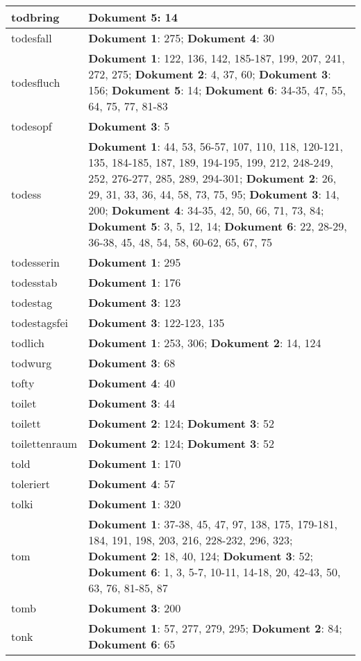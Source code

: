 \documentclass[a5paper]{article}
\begin{document}
\begin{longtable}[l]{|l|p{3in}|}
\hline
todbring & \textbf{Dokument 5}: 14 \\
\hline
todesfall & \textbf{Dokument 1}: 275; \textbf{Dokument 4}: 30 \\
\hline
todesfluch & \textbf{Dokument 1}: 122, 136, 142, 185-187, 199, 207, 241, 272, 275; \textbf{Dokument 2}: 4, 37, 60; \textbf{Dokument 3}: 156; \textbf{Dokument 5}: 14; \textbf{Dokument 6}: 34-35, 47, 55, 64, 75, 77, 81-83 \\
\hline
todesopf & \textbf{Dokument 3}: 5 \\
\hline
todess & \textbf{Dokument 1}: 44, 53, 56-57, 107, 110, 118, 120-121, 135, 184-185, 187, 189, 194-195, 199, 212, 248-249, 252, 276-277, 285, 289, 294-301; \textbf{Dokument 2}: 26, 29, 31, 33, 36, 44, 58, 73, 75, 95; \textbf{Dokument 3}: 14, 200; \textbf{Dokument 4}: 34-35, 42, 50, 66, 71, 73, 84; \textbf{Dokument 5}: 3, 5, 12, 14; \textbf{Dokument 6}: 22, 28-29, 36-38, 45, 48, 54, 58, 60-62, 65, 67, 75 \\
\hline
todesserin & \textbf{Dokument 1}: 295 \\
\hline
todesstab & \textbf{Dokument 1}: 176 \\
\hline
todestag & \textbf{Dokument 3}: 123 \\
\hline
todestagsfei & \textbf{Dokument 3}: 122-123, 135 \\
\hline
todlich & \textbf{Dokument 1}: 253, 306; \textbf{Dokument 2}: 14, 124 \\
\hline
todwurg & \textbf{Dokument 3}: 68 \\
\hline
tofty & \textbf{Dokument 4}: 40 \\
\hline
toilet & \textbf{Dokument 3}: 44 \\
\hline
toilett & \textbf{Dokument 2}: 124; \textbf{Dokument 3}: 52 \\
\hline
toilettenraum & \textbf{Dokument 2}: 124; \textbf{Dokument 3}: 52 \\
\hline
told & \textbf{Dokument 1}: 170 \\
\hline
toleriert & \textbf{Dokument 4}: 57 \\
\hline
tolki & \textbf{Dokument 1}: 320 \\
\hline
tom & \textbf{Dokument 1}: 37-38, 45, 47, 97, 138, 175, 179-181, 184, 191, 198, 203, 216, 228-232, 296, 323; \textbf{Dokument 2}: 18, 40, 124; \textbf{Dokument 3}: 52; \textbf{Dokument 6}: 1, 3, 5-7, 10-11, 14-18, 20, 42-43, 50, 63, 76, 81-85, 87 \\
\hline
tomb & \textbf{Dokument 3}: 200 \\
\hline
tonk & \textbf{Dokument 1}: 57, 277, 279, 295; \textbf{Dokument 2}: 84; \textbf{Dokument 6}: 65 \\

\end{longtable}
\end{document}
